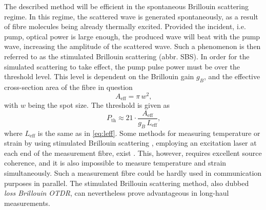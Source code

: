 \documentclass{standalone}
\begin{document}
The described method will be efficient in the spontaneous Brillouin scattering regime. In this regime, the scattered wave is generated spontaneously, as a result of fibre molecules being already thermally excited. Provided the incident, i.e. pump, optical power is large enough, the produced wave will beat with the pump wave, increasing the amplitude of the scattered wave. Such a phenomenon is then referred to as the stimulated Brillouin scattering (abbr. SBS). In order for the simulated scattering to take effect, the pump pulse power must be over the threshold level. This level is dependent on the Brillouin gain $g_B$, and the effective cross-section area of the fibre in question 
\begin{equation}
A_\textrm{eff} = \pi \, w^2 \textrm{,}
\end{equation}
with $w$ being the spot size. The threshold is given as
\begin{equation}
P_\textrm{th} \approx 21 \cdot \frac{A_\textrm{eff}}{g_B \, L_\textrm{eff}} \textrm{,}
\end{equation}
where $L_\textrm{eff}$ is the same as in \ref{eq:leff}. Some methods for measuring temperature or strain by using stimulated Brillouin scattering , employing an excitation laser at each end of the measurement fibre, exist \cite{Rogers1999}. This, however, requires excellent source coherence, and it is also impossible to measure temperature and strain simultaneously. Such a measurement fibre could be hardly used in communication purposes in parallel. The stimulated Brillouin scattering method, also dubbed \textit{loss Brillouin OTDR}, can nevertheless prove advantageous in long-haul measurements.
\end{document}
